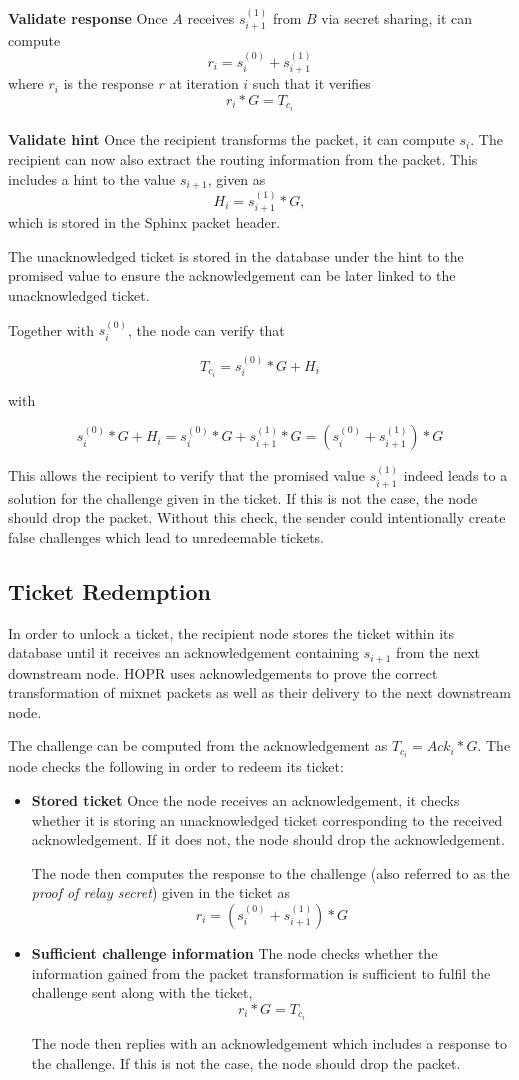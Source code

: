 \textbf{Validate response} Once $A$ receives $s_{i+1}^{(1)}$ from $B$ via secret sharing, it can compute $$r_i=s_i^{(0)}+s_{i+1}^{(1)}$$ where $r_i$ is the response $r$ at iteration $i$ such that it verifies
$$r_i*G=T_{c_i}$$
\\\textbf{Validate hint} Once the recipient transforms the packet, it can compute $s_i$. The recipient can now also extract the routing information from the packet.
This includes a hint to the value $s_{i+1}$, given as $$H_i=s_{i+1}^{(1)}*G,$$ which is stored in the Sphinx packet header.

The unacknowledged ticket is stored in the database under the hint to the promised value to ensure the acknowledgement can be later linked to the unacknowledged ticket.

Together with $s_i^{(0)}$, the node can verify that

$$T_{c_i}=s_i^{(0)}*G+H_i$$

with

$$s_i^{(0)}*G+H_i=s_i^{(0)}*G+s_{i+1}^{(1)}*G=(s_i^{(0)}+s_{i+1}^{(1)})*G$$

This allows the recipient to verify that the promised value $s_{i+1}^{(1)}$ indeed leads to a solution for the challenge given in the ticket. If this is not the case, the node should drop the packet. Without this check, the sender could intentionally create false challenges which lead to unredeemable tickets.


\subsection{Ticket Redemption}

In order to unlock a ticket, the recipient node stores the ticket within its database until it receives an acknowledgement containing $s_{i+1}$ from the next downstream node. HOPR uses acknowledgements to prove the correct transformation of mixnet packets as well as their delivery to the next downstream node.

The challenge can be computed from the acknowledgement as $T_{c_i}=Ack_i*G$. The node checks the following in order to redeem its ticket:
\begin{itemize}
      \item
            \textbf{Stored ticket} Once the node receives an acknowledgement, it checks whether it is storing an unacknowledged ticket corresponding to the received acknowledgement. If it does not, the node should drop the acknowledgement.

            The node then computes the response to the challenge (also referred to as the \textit{proof of relay secret}) given in the ticket as $$r_i=(s_i^{(0)}+s_{i+1}^{(1)})*G$$
      \item
            \textbf{Sufficient challenge information} The node checks whether the information gained from the packet transformation is sufficient to fulfil the challenge sent along with the ticket, $$r_i*G=T_{c_i}$$

            The node then replies with an acknowledgement which includes a response to the challenge. If this is not the case, the node should drop the packet.
\end{itemize}

